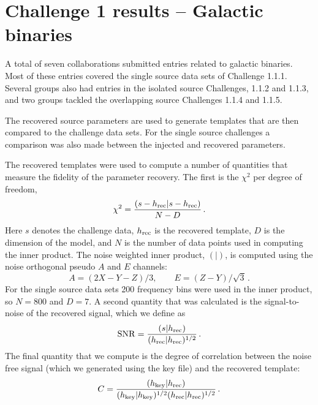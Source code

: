 \documentclass[11pt]{article}
\begin{document}
\section{Challenge 1 results -- Galactic binaries}

A total of seven collaborations submitted entries related to galactic binaries.
Most of these entries covered the single source data sets of Challenge 1.1.1.
Several groups also had entries in the isolated source Challenges, 1.1.2
and 1.1.3, and two groups tackled the overlapping source Challenges 1.1.4 and
1.1.5.

The recovered source parameters are used to generate templates that are then
compared to the challenge data sets. For the single source challenges a comparison
was also made between the injected and recovered parameters.

The recovered templates were used to compute a number of quantities that
measure the fidelity of the parameter recovery. The first is the $\chi^2$
per degree of freedom,
\begin{equation}
\chi^2 = \frac{ ( s -h_{\rm rec} | s -h_{\rm rec})}{N -D} \, .
\end{equation}
Here $s$ denotes the challenge data, $h_{\rm rec}$ is the recovered template,
$D$ is the dimension of the model, and $N$ is the number of data points
used in computing the inner product. The noise weighted inner product, $( | )$, is
computed using the noise orthogonal pseudo $A$ and $E$ channels:
\begin{equation}
A = (2 X - Y -Z)/3, \quad \quad E = (Z-Y)/\sqrt{3} \, .
\end{equation}
For the single source data sets 200 frequency bins were used in the
inner product, so $N=800$ and $D=7$. A second quantity that was calculated
is the signal-to-noise of the recovered signal, which we define as
\begin{equation}
{\rm SNR} = \frac{(s | h_{\rm rec})}{(h_{\rm rec} | h_{\rm rec})^{1/2}} \, .
\end{equation}
The final quantity that we compute is the degree of correlation between the
noise free signal (which we generated using the key file) and the
recovered template:
\begin{equation}
C = \frac{( h_{\rm key} | h_{\rm rec})}{(h_{\rm key} | h_{\rm key})^{1/2}(h_{\rm rec} | h_{\rm rec})^{1/2}} \, .
\end{equation}
\end{document}
